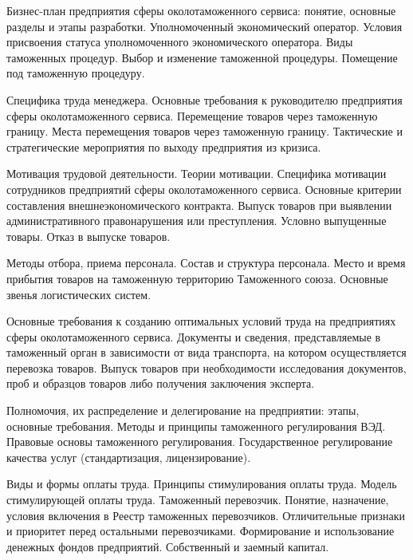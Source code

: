 \documentclass[
	11pt,
	a4paper,
	]
	{article}
\begin{document}
\bigskip

\noindent{} 
	{
		Бизнес-план предприятия сферы околотаможенного сервиса: понятие, основные разделы и этапы разработки.
	}{
		Уполномоченный экономический оператор. Условия присвоения статуса уполномоченного экономического оператора.
	}{
		Виды таможенных процедур. Выбор и изменение таможенной процедуры. Помещение под таможенную процедуру.
	}

\bigskip

\noindent{} 
	{
		Специфика труда менеджера. Основные требования к руководителю предприятия сферы околотаможенного сервиса.
	}{
		Перемещение товаров через таможенную границу. Места перемещения товаров через таможенную границу.
	}{
		Тактические и стратегические мероприятия по выходу предприятия из кризиса.
	}

\bigskip

\noindent{} 
	{
		Мотивация трудовой деятельности. Теории мотивации. Специфика мотивации сотрудников предприятий сферы околотаможенного сервиса.
	}{
		Основные критерии составления внешнеэкономического контракта.
	}{
		Выпуск товаров при выявлении административного правонарушения или преступления. Условно выпущенные товары. Отказ в выпуске товаров.
	}

\bigskip

\noindent{} 
	{
		Методы отбора, приема персонала. Состав и структура персонала.
	}{
		Место и время прибытия товаров на таможенную территорию Таможенного союза.
	}{
		Основные звенья логистических систем.
	}

\bigskip

\noindent{} 
	{
		Основные требования к созданию оптимальных условий труда на предприятиях сферы околотаможенного сервиса.
	}{
		Документы и сведения, представляемые в таможенный орган в зависимости от вида транспорта, на котором осуществляется перевозка товаров.
	}{
		Выпуск товаров при необходимости исследования документов, проб и образцов товаров либо получения заключения эксперта.
	}

\bigskip

\noindent{} 
	{
		Полномочия, их распределение и делегирование на предприятии: этапы, основные требования.
	}{
		Методы и принципы таможенного регулирования ВЭД. Правовые основы таможенного регулирования.
	}{
		Государственное регулирование качества услуг (стандартизация, лицензирование).
	}

\bigskip

\noindent{} 
	{
		Виды и формы оплаты труда. Принципы стимулирования оплаты труда. Модель стимулирующей оплаты труда.
	}{
		Таможенный перевозчик. Понятие, назначение, условия включения в Реестр таможенных перевозчиков. Отличительные признаки и приоритет перед остальными перевозчиками.
	}{
		Формирование и использование денежных фондов предприятий. Собственный и заемный капитал.
	}
\end{document}
